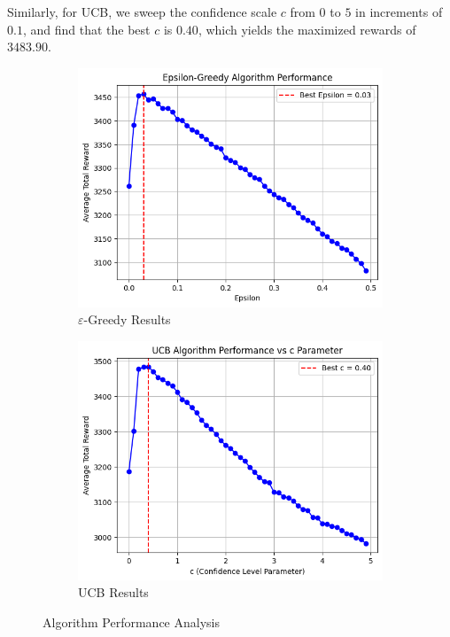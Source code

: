 \documentclass[11pt]{article}
\begin{document}
Similarly, for UCB, we sweep the confidence scale $c$ from $0$ to $5$ in increments of $0.1$, and find that the best $c$ is $0.40$, which yields the maximized rewards of $3483.90$.

\begin{figure}[h]
    \centering
    \begin{subfigure}[b]{0.45\textwidth}
        \includegraphics[width=\textwidth]{pics/greedy.png}
        \caption{\(\varepsilon\)-Greedy Results}
        \label{fig:epsilon_greedy}
    \end{subfigure}
    \hfill
    \begin{subfigure}[b]{0.45\textwidth}
        \includegraphics[width=\textwidth]{pics/ucb.png}
        \caption{UCB Results}
        \label{fig:ucb}
    \end{subfigure}
    \caption{Algorithm Performance Analysis}
    \label{fig:results}
\end{figure}
\end{document}
